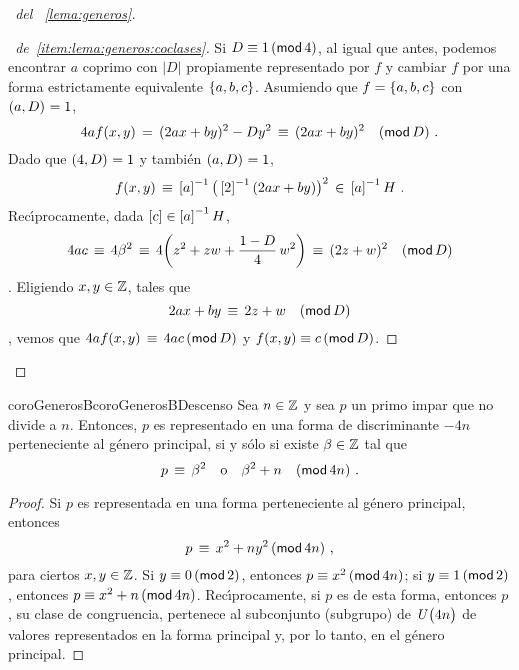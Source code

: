\begin{proof}[\proofname~del \lemaname~\ref{lema:generos}]
\begin{proof}[\proofname~de~\ref{item:lema:generos:coclases}]
		Si $D\equiv 1\tmodulo[4]$, al igual que antes, podemos
		encontrar $a$ coprimo con $|D|$ propiamente representado
		por $f$ y cambiar $f$ por una forma estrictamente
		equivalente $\binaria{a,b,c}$. Asumiendo que
		$f=\binaria{a,b,c}$ con $\mcd{a,D}=1$,
		\begin{displaymath}
			4af(x,y)\,=\,(2ax+by)^2-Dy^2\,\equiv\,
				(2ax+by)^2\modulo[D]
			\dispstop
		\end{displaymath}
		Dado que $\mcd{4,D}=1$ y tambi\'en $\mcd{a,D}=1$,
		\begin{displaymath}
			f(x,y)\,\equiv\,\clase a^{-1}\big(
				\clase 2^{-1}(2ax+by)\big)^2
				\,\in\,\clase a^{-1}H
			\dispstop
		\end{displaymath}
		Rec\'{\i}procamente, dada $\clase c\in\clase a^{-1}H$,
		\begin{displaymath}
			4ac\,\equiv\,4\beta^2\,\equiv\,
				4\bigg(z^2+zw+\frac{1-D} 4\,w^2\bigg)
				\,\equiv\,(2z+w)^2\modulo[D]
		\end{displaymath}
		\quedacomoejercicio.
		Eligiendo $x,y\in\Enteros$, tales que
		\begin{displaymath}
			2ax+by\,\equiv\,2z+w\modulo[D]
		\end{displaymath}
		\quedacomoejercicio,
		vemos que $4af(x,y)\,\equiv\,4ac\tmodulo[D]$ y
		$f(x,y)\equiv c\tmodulo[D]$.
	\end{proof}
\end{proof}

\begin{restatable}{coroGenerosB}{coroGenerosBDescenso}
	\label{coro:generos:cero}
	Sea $n\in\Enteros$ y sea $p$ un primo impar que no
	divide a $n$. Entonces, $p$ es representado en una forma de
	discriminante $-4n$ perteneciente al g\'enero principal, si
	y s\'olo si existe $\beta\in\Enteros$ tal que
	\begin{displaymath}
		p\,\equiv\,\beta^2\dispor\beta^2+n\modulo[4n]
		\dispstop
	\end{displaymath}
\end{restatable}

\begin{proof}
	Si $p$ es representada en una forma perteneciente al g\'enero
	principal, entonces
	\begin{displaymath}
		p\,\equiv\,x^2+ny^2\tmodulo[4n]
		\dispcomma
	\end{displaymath}
	para ciertos $x,y\in\Enteros$.
	Si $y\equiv 0\tmodulo[2]$, entonces $p\equiv x^2\tmodulo[4n]$;
	si $y\equiv 1\tmodulo[2]$, entonces $p\equiv x^2+n\tmodulo[4n]$.
	Rec\'{\i}procamente, si $p$ es de esta forma, entonces $p$,
	su clase de congruencia, pertenece al subconjunto (subgrupo)
	de $\Unidadesmod[4n]$ de valores representados en la forma
	principal y, por lo tanto, en el g\'enero principal.
\end{proof}

